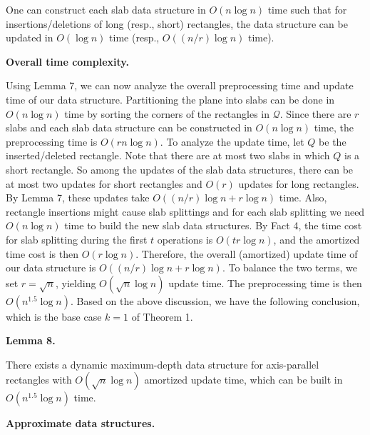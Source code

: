 \documentclass[10pt,a4paper]{article}
\begin{document}
One can construct each slab data structure in $O(n\log n)$ time such that for insertions/deletions of long (resp., short) rectangles, the data structure can be updated in $O(\log n)$ time (resp., $O((n/r)\log n)$ time).
\par
\par
\par
\par\medskip\noindent\textbf{Overall time complexity.}\par
Using Lemma 7, we can now analyze the overall preprocessing time and update time of our data structure. Partitioning the plane into slabs can be done in $O(n\log n)$ time by sorting the corners of the rectangles in $\mathcal{Q}$. Since there are $r$ slabs and each slab data structure can be constructed in $O(n\log n)$ time, the preprocessing time is $O(rn\log n)$. To analyze the update time, let $Q$ be the inserted/deleted rectangle. Note that there are at most two slabs in which $Q$ is a short rectangle. So among the updates of the slab data structures, there can be at most two updates for short rectangles and $O(r)$ updates for long rectangles. By Lemma 7, these updates take $O((n/r)\log n+r\log n)$ time. Also, rectangle insertions might cause slab splittings and for each slab splitting we need $O(n\log n)$ time to build the new slab data structures. By Fact 4, the time cost for slab splitting during the first $t$ operations is $O(tr\log n)$, and the amortized time cost is then $O(r\log n)$. Therefore, the overall (amortized) update time of our data structure is $O((n/r)\log n+r\log n)$. To balance the two terms, we set $r=\sqrt{n}$, yielding $O(\sqrt{n}\log n)$ update time. The preprocessing time is then $O(n^{1.5}\log n)$. Based on the above discussion, we have the following conclusion, which is the base case $k=1$ of Theorem 1.
\par
\par
\par\medskip\noindent\textbf{Lemma 8.}\par
There exists a dynamic maximum-depth data structure for axis-parallel rectangles with $O(\sqrt{n}\log n)$ amortized update time, which can be built in $O(n^{1.5}\log n)$ time.
\par
\par
\par
\par\medskip\noindent\textbf{Approximate data structures.}\par
\end{document}

